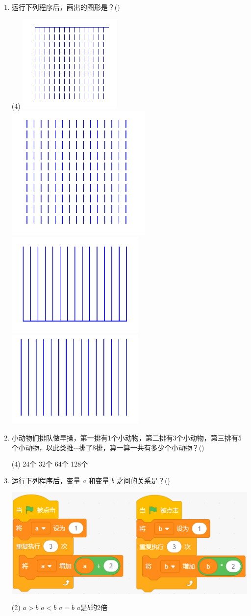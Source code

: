 \documentclass[10pt, a4paper]{article}
\newcommand{\hq}{\hfill(\qquad)}
\begin{document}
\begin{enumerate}
        \item 运行下列程序后，画出的图形是？\hq
        \begin{tasks}(4)
            \task \includegraphics[width=.08\textwidth]{figure/14a.png}
            \task \includegraphics[width=.08\textwidth]{figure/14b.png}
            \task \includegraphics[width=.1\textwidth]{figure/14c.png}
            \task \includegraphics[width=.1\textwidth]{figure/14d.png}
        \end{tasks}

        \newpage
        \item 小动物们排队做早操，第一排有1个小动物，第二排有3个小动物，第三排有5个小动物，以此类推$\cdots$排了8排，算一算一共有多少个小动物？\hq
        \begin{tasks}(4)
            \task 24个
            \task 32个
            \task 64个
            \task 128个
        \end{tasks}

        \item 运行下列程序后，变量 $a$ 和变量 $b$ 之间的关系是？\hq
        
        \begin{minipage}{.4\textwidth}
            \centering
            \includegraphics[width=.8\textwidth]{figure/16.png}
        \end{minipage}
        \begin{minipage}{.5\textwidth}
            \begin{tasks}(2)
                \task $a>b$
                \task $a<b$
                \task $a=b$
                \task $a$是$b$的2倍
            \end{tasks}
        \end{minipage}
        


\end{enumerate}
\end{document}
